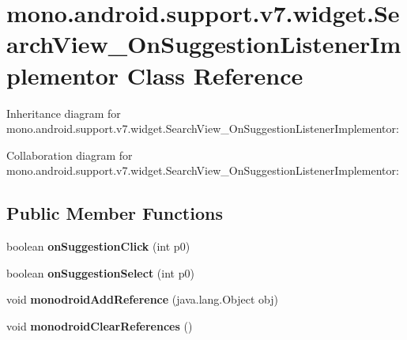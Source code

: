 \hypertarget{classmono_1_1android_1_1support_1_1v7_1_1widget_1_1_search_view___on_suggestion_listener_implementor}{}\section{mono.\+android.\+support.\+v7.\+widget.\+Search\+View\+\_\+\+On\+Suggestion\+Listener\+Implementor Class Reference}
\label{classmono_1_1android_1_1support_1_1v7_1_1widget_1_1_search_view___on_suggestion_listener_implementor}


Inheritance diagram for mono.\+android.\+support.\+v7.\+widget.\+Search\+View\+\_\+\+On\+Suggestion\+Listener\+Implementor\+:


Collaboration diagram for mono.\+android.\+support.\+v7.\+widget.\+Search\+View\+\_\+\+On\+Suggestion\+Listener\+Implementor\+:
\subsection*{Public Member Functions}
\begin{DoxyCompactItemize}
\item 
\mbox{\label{classmono_1_1android_1_1support_1_1v7_1_1widget_1_1_search_view___on_suggestion_listener_implementor_adf271189585405221f4ec0056022b836}} 
boolean {\bfseries on\+Suggestion\+Click} (int p0)
\item 
\mbox{\label{classmono_1_1android_1_1support_1_1v7_1_1widget_1_1_search_view___on_suggestion_listener_implementor_aedc377e3efa764d9a340e4fb489d95e7}} 
boolean {\bfseries on\+Suggestion\+Select} (int p0)
\item 
\mbox{\label{classmono_1_1android_1_1support_1_1v7_1_1widget_1_1_search_view___on_suggestion_listener_implementor_a2b53b8bc0b5b5ea851eaf812bf3f33c1}} 
void {\bfseries monodroid\+Add\+Reference} (java.\+lang.\+Object obj)
\item 
\mbox{\label{classmono_1_1android_1_1support_1_1v7_1_1widget_1_1_search_view___on_suggestion_listener_implementor_a18c038c967faebaff57c907d5d3d920b}} 
void {\bfseries monodroid\+Clear\+References} ()
\end{DoxyCompactItemize}
